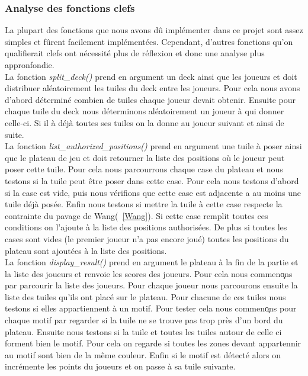 \documentclass[12pt,a4paper]{extarticle}
\begin{document}
    \subsubsection{Analyse des fonctions clefs}
    La plupart des fonctions que nous avons d\^u impl\'ementer dans ce projet sont assez simples et f\^urent facilement impl\'ement\'ees. Cependant, d'autres fonctions qu'on qualifierait  
    clefs ont n\'ecessit\'e plus de r\'eflexion et donc une analyse plus appronfondie.
    \newline \\
    La fonction \emph{split\_deck()} prend en argument un deck ainsi que les joueurs et doit distribuer al\'eatoirement les tuiles du deck entre les joueurs. 
    Pour cela nous avons d'abord d\'etermin\'e combien de tuiles chaque joueur devait obtenir. Ensuite pour chaque tuile du deck nous d\'eterminons 
    al\'eatoirement un joueur \`a qui donner celle-ci. Si il \`a d\'ej\`a toutes ses tuiles on la donne au joueur suivant et ainsi de suite.
    \newline \\
    La fonction \emph{list\_authorized\_positions()} prend en argument une tuile \`a poser ainsi que le plateau de jeu et doit retourner la liste des 
    positions o\`u le joueur peut poser cette tuile. Pour cela nous parcourrons chaque case du plateau et nous testons si la tuile peut \^etre poser dans cette case.
    Pour cela nous testons d'abord si la case est vide, puis nous v\'erifions que cette case est adjacente a au moins une tuile d\'ej\`a pos\'ee. 
    Enfin nous testons si mettre la tuile \`a cette case respecte la contrainte du pavage de Wang(~\ref{Wang}). Si cette case remplit toutes 
    ces conditions on l'ajoute \`a la liste des positions authoris\'ees. De plus si toutes les cases sont vides (le premier joueur n'a pas 
    encore jou\'e) toutes les positions du plateau sont ajout\'ees \`a la liste des positions.
    \newline \\
    La fonction \emph{display\_result()} prend en argument le plateau \`a la fin de la partie et la liste des joueurs et renvoie les scores des joueurs. 
    Pour cela nous commen\c ons par parcourir la liste des joueurs. Pour chaque joueur nous parcourons ensuite la liste des tuiles qu'ils ont
     plac\'e sur le plateau. Pour chacune de ces tuiles nous testons si elles appartiennent \`a un motif. Pour tester cela nous commen\c ons 
     pour chaque motif par regarder si la tuile ne se trouve pas trop pr\`es d'un bord du plateau. Ensuite nous testons si la tuile et toutes 
     les tuiles autour de celle ci forment bien le motif. Pour cela on regarde si toutes les zones devant appartennir au motif sont bien de la 
     m\^eme couleur. Enfin si le motif est d\'etect\'e alors on incr\'emente les points du joueurs et on passe \`a sa tuile suivante.
    
\end{document}
